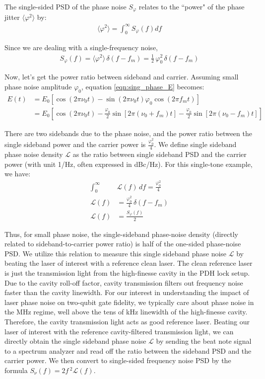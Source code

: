 \documentclass[11pt]{report}
\begin{document}
The single-sided PSD of the phase noise $S_\varphi$ relates to the ``power" of the phase jitter $\langle \varphi^2 \rangle$ by:
\begin{align}
    \langle \varphi^2 \rangle = \int_0^{\infty} S_{\varphi}(f) df
\end{align}

Since we are dealing with a single-frequency noise, 
\begin{align}
    S_\varphi(f) = \langle \varphi^2 \rangle \, \delta(f-f_m) = \frac{1}{2}\, \varphi_0^2 \,\delta(f-f_m)
\end{align}

Now, let's get the power ratio between sideband and carrier. Assuming small phase noise amplitude $\varphi_0$, equation \ref{eqn:sing_phase_E} becomes:
\begin{align}
    E(t) &= E_0 [ \cos(2\pi \nu_0 t)  -\sin(2\pi \nu_0 t) \varphi_0 \cos(2\pi f_mt)] \\
    &= E_0 [ \cos(2\pi \nu_0 t)  -\frac{\varphi_0}{2} \sin[2\pi (\nu_0+f_m)t] -  \frac{\varphi_0}{2} \sin[2\pi (\nu_0-f_m)t]]
\end{align}

There are two sidebands due to the phase noise, and the power ratio between the single sideband power and the carrier power is $\frac{\varphi_0^2}{4}$. We define single sideband phase noise density $\mathcal{L}$ as the ratio between single sideband PSD and the carrier power (with unit 1/Hz, often expressed in dBc/Hz). For this single-tone example, we have:
\begin{align}
    \int_0^{\infty} &\mathcal{L}(f) \, df = \frac{\varphi_0^2}{4} \\
    \mathcal{L}(f) &= \frac{\varphi_0^2}{4} \, \delta(f-f_m) \\
    \mathcal{L}(f) &= \frac{S_\varphi(f)}{2}
\end{align}

Thus, for small phase noise, the single-sideband phase-noise density (directly related to sideband-to-carrier power ratio) is half of the one-sided phase-noise PSD. We utilize this relation to measure this single sideband phase noise $\mathcal{L}$ by beating the laser of interest with a reference clean laser. The clean reference laser is just the transmission light from the high-finesse cavity in the PDH lock setup. Due to the cavity roll-off factor, cavity transmission filters out frequency noise faster than the cavity linewidth. For our interest in understanding the impact of laser phase noise on two-qubit gate fidelity, we typically care about phase noise in the MHz regime, well above the tens of kHz linewidth of the high-finesse cavity. Therefore, the cavity transmission light acts as good reference laser. Beating our laser of interest with the reference cavity-filtered transmission light, we can directly obtain the single sideband phase noise $\mathcal{L}$ by sending the beat note signal to a spectrum analyzer and read off the ratio between the sideband PSD and the carrier power. We then convert to single-sided frequency noise PSD by the formula $S_\nu(f) = 2 f\,^{2} \mathcal{L}(f)$. 
\end{document}

